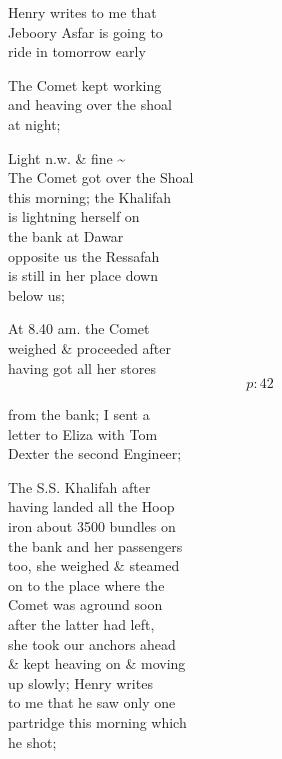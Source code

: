 \documentclass{report}
\begin{document}
	\par{
 	Henry writes to me that\ \\Jeboory Asfar is going to\ \\ride in tomorrow early\ \\
	}

	\par{
 	The Comet kept working\ \\and heaving over the shoal\ \\at night;\ \\
	}

	\par{
 	Light n.w. \& fine \~{}\ \\The Comet got over the Shoal\ \\this morning; the Khalifah\ \\is lightning herself on\ \\the bank at Dawar\ \\opposite us the Ressafah\ \\is still in her place down\ \\below us;\ \\
	}

	\par{
 	At 8.40 am. the Comet\ \\weighed \& proceeded after\ \\having got all her stores\ \\
  \[p: 42 \]

	}

	\par{
 	from the bank; I sent a\ \\letter to Eliza with Tom\ \\Dexter the second Engineer;\ \\
	}

	\par{
 	The S.S. Khalifah after\ \\having landed all the Hoop\ \\iron about 3500 bundles on\ \\the bank and her passengers\ \\too, she weighed \& steamed\ \\on to the place where the\ \\Comet was aground soon\ \\after the latter had left,\ \\she took our anchors ahead\ \\\& kept heaving on \& moving\ \\up slowly; Henry writes\ \\to me that he saw only one\ \\partridge this morning which\ \\he shot;\ \\
	}
\end{document}
